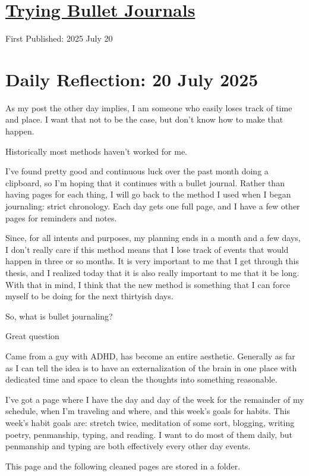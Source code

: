 \documentclass[12pt]{article}
\renewcommand{\,}{\textsuperscript{,}}
\begin{document}
  
\doublespacing  
\section{\href{bullet-journal.html}{Trying Bullet Journals}}  
First Published: 2025 July 20

\section{Daily Reflection: 20 July 2025}

As my post the other day implies, I am someone who easily loses track of time and place.  
I want that not to be the case, but don't know how to make that happen.

Historically most methods haven't worked for me.

I've found pretty good and continuous luck over the past month doing a clipboard, so I'm hoping that it continues with a bullet journal.  
Rather than having pages for each thing, I will go back to the method I used when I began journaling: strict chronology.  
Each day gets one full page, and I have a few other pages for reminders and notes.

Since, for all intents and purposes, my planning ends in a month and a few days, I don't really care if this method means that I lose track of events that would happen in three or so months.  
It is very important to me that I get through this thesis, and I realized today that it is also really important to me that it be long.  
With that in mind, I think that the new method is something that I can force myself to be doing for the next thirtyish days.

So, what is bullet journaling?

Great question

Came from a guy with ADHD, has become an entire aesthetic.  
Generally as far as I can tell the idea is to have an externalization of the brain in one place with dedicated time and space to clean the thoughts into something reasonable.

I've got a page where I have the day and day of the week for the remainder of my schedule, when I'm traveling and where, and this week's goals for habits.  
This week's habit goals are: stretch twice, meditation of some sort, blogging, writing poetry, penmanship, typing, and reading.  
I want to do most of them daily, but penmanship and typing are both effectively every other day events.

This page and the following cleaned pages are stored in a folder.
\end{document}
